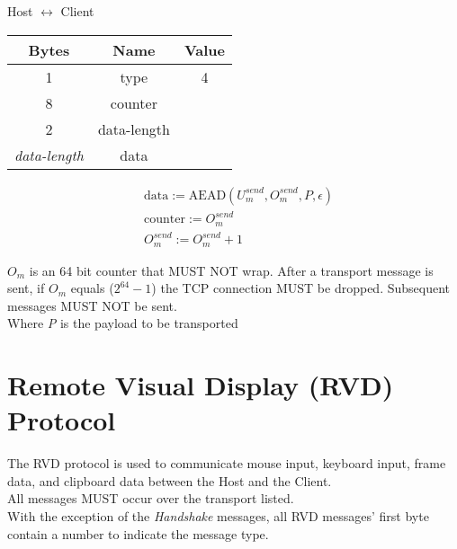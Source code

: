 \documentclass{article}
\begin{document}
    \begin{center}
        Host $\leftrightarrow$ Client\\
        \begin{tabular}{|c|c|c|}
            \hline
            \textbf{Bytes}     & \textbf{Name} & \textbf{Value} \\
            \hline
            1                  & type          & 4              \\
            \hline
            8                  & counter       &                \\
            \hline
            2                  & data-length   &                \\
            \hline
            \emph{data-length} & data          &                \\
            \hline
        \end{tabular}
    \end{center}

    \begin{align*}
        & \text{data} := \text{AEAD}(U_{m}^{send}, O_{m}^{send}, P, \epsilon)\\
        & \text{counter} := O_{m}^{send}\\
        & O_{m}^{send} := O_{m}^{send} + 1
    \end{align*}

    $O_{m}$ is an 64 bit counter that MUST NOT wrap. After a transport message is sent, if $O_{m}$ equals
    ($2^{64}-1$) the TCP connection MUST be dropped. Subsequent messages MUST NOT be sent. \\


    Where \emph{P} is the payload to be transported


    \section{Remote Visual Display (RVD) Protocol}

    The RVD protocol is used to communicate mouse input, keyboard input, frame data, and clipboard data between the
    Host and the Client.\\

    All messages MUST occur over the transport listed.\\

    With the exception of the \emph{Handshake} messages, all RVD messages' first byte contain a number to indicate
    the message type. \\
\end{document}
